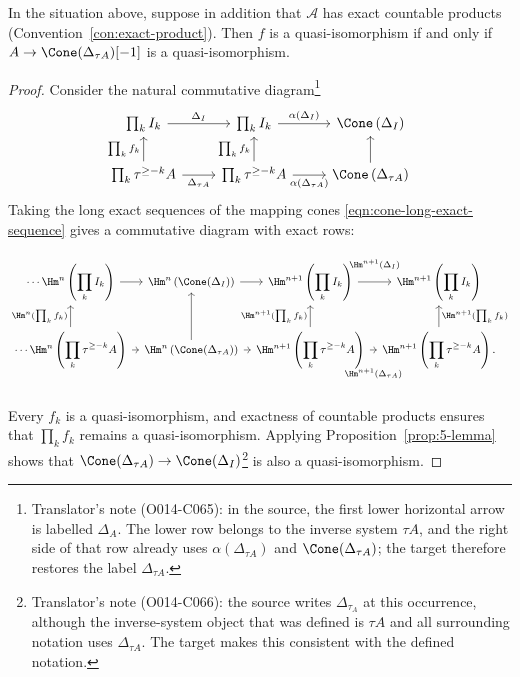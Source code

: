 \begin{lemma}\label{prop:K-injective-equiv}
	In the situation above, suppose in addition that $\mathcal{A}$ has exact
	countable products (Convention~\ref{con:exact-product}). Then $f$ is a
	quasi-isomorphism if and only if
	$A\to\Cone(\Delta_{\tau A})[-1]$ is a quasi-isomorphism.
\end{lemma}

\begin{proof}
	Consider the natural commutative diagram\footnote{Translator's note
	(O014-C065): in the source, the first lower horizontal arrow is labelled
	$\Delta_A$. The lower row belongs to the inverse system $\tau A$, and
	the right side of that row already uses $\alpha(\Delta_{\tau A})$ and
	$\Cone(\Delta_{\tau A})$; the target therefore restores the label
	$\Delta_{\tau A}$.}
	\[\begin{tikzcd}
		\prod_k I_k \arrow[r, "\Delta_I"] &
		\prod_k I_k \arrow[r, "{\alpha(\Delta_I)}"] &
		\Cone\left(\Delta_I\right) \\
		\prod_k \tau^{\geq-k}A \arrow[r, "\Delta_{\tau A}"']
		\arrow[u, "{\prod_k f_k}"] &
		\prod_k \tau^{\geq-k}A \arrow[u, "{\prod_k f_k}"]
		\arrow[r, "{\alpha(\Delta_{\tau A})}"'] &
		\Cone\left(\Delta_{\tau A}\right) \arrow[u]
	\end{tikzcd}\]
	Taking the long exact sequences of the mapping cones
	\eqref{eqn:cone-long-exact-sequence} gives a commutative diagram with
	exact rows:
	\[\begin{tikzcd}
		[column sep=tiny, every cell/.append style = {font = \small}]
		\cdots \Hm^n\left( \displaystyle\prod_k I_k \right) \arrow[r] &
		\Hm^n\left( \Cone(\Delta_I) \right) \arrow[r] &
		\Hm^{n+1}\left( \displaystyle\prod_k I_k \right)
		\arrow[r, "{\Hm^{n+1}(\Delta_I)}" inner sep=1em] &
		\Hm^{n+1}\left( \displaystyle\prod_k I_k \right) \\
		\cdots \Hm^n\left( \displaystyle\prod_k \tau^{\geq-k} A \right)
		\arrow[r] \arrow[u, "{\Hm^n(\prod_k f_k)}"] &
		\Hm^n\left( \Cone(\Delta_{\tau A}) \right)
		\arrow[r] \arrow[u] &
		\Hm^{n+1}\left(\displaystyle\prod_k \tau^{\geq-k} A \right)
		\arrow[u, "{\Hm^{n+1}(\prod_k f_k)}"]
		\arrow[r, "{\Hm^{n+1}(\Delta_{\tau A})}"' inner sep=1.5em] &
		\Hm^{n+1}\left( \displaystyle\prod_k \tau^{\geq-k} A \right)
		\arrow[u, "{\Hm^{n+1}(\prod_k f_k)}"'] .
	\end{tikzcd}\]
	Every $f_k$ is a quasi-isomorphism, and exactness of countable products
	ensures that $\prod_k f_k$ remains a quasi-isomorphism. Applying
	Proposition~\ref{prop:5-lemma} shows that
	$\Cone(\Delta_{\tau A})\to\Cone(\Delta_I)$\footnote{Translator's note
	(O014-C066): the source writes $\Delta_{\tau_A}$ at this occurrence,
	although the inverse-system object that was defined is $\tau A$ and all
	surrounding notation uses $\Delta_{\tau A}$. The target makes this
	consistent with the defined notation.} is also a quasi-isomorphism.


\end{proof}
